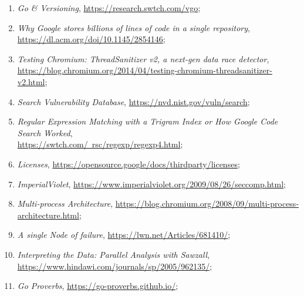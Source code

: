 \documentclass[a4paper,11pt]{article}
\begin{document}
\begin{enumerate}
\item \emph{Go \& Versioning},
  \href{https://research.swtch.com/vgo}{https://research.swtch.com/vgo};

\item \emph{Why Google stores billions of lines of code in a single
    repository},
  \href{https://dl.acm.org/doi/10.1145/2854146}{https://dl.acm.org/doi/10.1145/2854146};

\item \emph{Testing Chromium: ThreadSanitizer v2, a next-gen data race
    detector}, \\
  \href{https://blog.chromium.org/2014/04/testing-chromium-threadsanitizer-v2.html}{https://blog.chromium.org/2014/04/testing-chromium-threadsanitizer-v2.html};

\item \emph{Search Vulnerability Database},
  \href{https://nvd.nist.gov/vuln/search}{https://nvd.nist.gov/vuln/search};

\item \emph{Regular Expression Matching with a Trigram Index or How
    Google Code Search Worked}, \\
  \href{https://swtch.com/~rsc/regexp/regexp4.html}{https://swtch.com/~rsc/regexp/regexp4.html};

\item \emph{Licenses},
  \href{https://opensource.google/docs/thirdparty/licenses}{https://opensource.google/docs/thirdparty/licenses};

\item \emph{ImperialViolet},
  \href{https://www.imperialviolet.org/2009/08/26/seccomp.html}{https://www.imperialviolet.org/2009/08/26/seccomp.html};

\item \emph{Multi-process Architecture},
  \href{https://blog.chromium.org/2008/09/multi-process-architecture.html}{https://blog.chromium.org/2008/09/multi-process-architecture.html};

\item \emph{A single Node of failure},
  \href{https://lwn.net/Articles/681410/}{https://lwn.net/Articles/681410/};

\item \emph{Interpreting the Data: Parallel Analysis with Sawzall},
  \href{https://www.hindawi.com/journals/sp/2005/962135/}{https://www.hindawi.com/journals/sp/2005/962135/};

\item \emph{Go Proverbs},
  \href{https://go-proverbs.github.io/}{https://go-proverbs.github.io/};


\end{enumerate}
\end{document}
